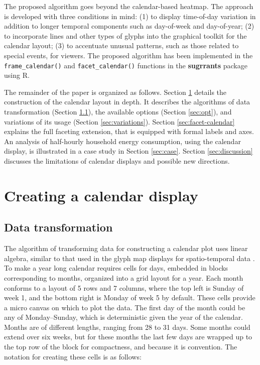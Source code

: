 \documentclass[12pt]{article}
\begin{document}
The proposed algorithm goes beyond the calendar-based heatmap. The approach is developed with three conditions in mind: (1) to display time-of-day variation in addition to longer temporal components such as day-of-week and day-of-year; (2) to incorporate lines and other types of glyphs into the graphical toolkit for the calendar layout; (3) to accentuate unusual patterns, such as those related to special events, for viewers. The proposed algorithm has been implemented in the \texttt{frame\_calendar()} and \texttt{facet\_calendar()} functions in the \textbf{sugrrants} package using R.

The remainder of the paper is organized as follows. Section \ref{sec:algorithm} details the construction of the calendar layout in depth. It describes the algorithms of data transformation (Section \ref{sec:transformation}), the available options (Section \ref{sec:opt}), and variations of its usage (Section \ref{sec:variations}). Section \ref{sec:facet-calendar} explains the full faceting extension, that is equipped with formal labels and axes. An analysis of half-hourly household energy consumption, using the calendar display, is illustrated in a case study in Section \ref{sec:case}. Section \ref{sec:discussion} discusses the limitations of calendar displays and possible new directions.

\hypertarget{sec:algorithm}{%
\section{Creating a calendar display}\label{sec:algorithm}}

\hypertarget{sec:transformation}{%
\subsection{Data transformation}\label{sec:transformation}}

The algorithm of transforming data for constructing a calendar plot uses linear algebra, similar to that used in the glyph map displays for spatio-temporal data \citep{Wickham2012glyph}. To make a year long calendar requires cells for days, embedded in blocks corresponding to months, organized into a grid layout for a year. Each month conforms to a layout of 5 rows and 7 columns, where the top left is Sunday of week 1, and the bottom right is Monday of week 5 by default. These cells provide a micro canvas on which to plot the data. The first day of the month could be any of Monday--Sunday, which is deterministic given the year of the calendar. Months are of different lengths, ranging from 28 to 31 days. Some months could extend over six weeks, but for these months the last few days are wrapped up to the top row of the block for compactness, and because it is convention. The notation for creating these cells is as follows:
\end{document}
